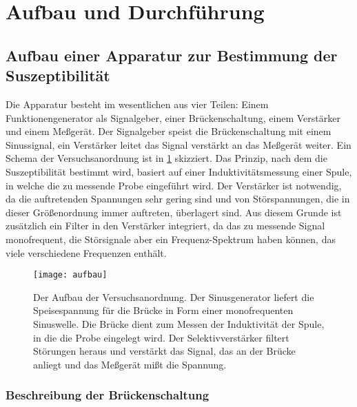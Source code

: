 
\section{Aufbau und Durchführung}

\subsection{Aufbau einer Apparatur zur Bestimmung der Suszeptibilität}
\label{sec:aufbau-apparatur}

Die Apparatur besteht im wesentlichen aus vier Teilen: Einem
Funktionengenerator als Signalgeber, einer Brückenschaltung, einem
Verstärker und einem Meßgerät.  Der Signalgeber speist die
Brückenschaltung mit einem Sinussignal, ein Verstärker leitet das Signal
verstärkt an das Meßgerät weiter.  Ein Schema der Versuchsanordnung ist
in \cref{fig:schema-aufbau} skizziert.  Das Prinzip, nach dem die
Suszeptibilität bestimmt wird, basiert auf einer Induktivitätsmessung
einer Spule, in welche die zu messende Probe eingeführt wird.  Der
Verstärker ist notwendig, da die auftretenden Spannungen sehr gering
sind und von Störspannungen, die in dieser Größenordnung immer
auftreten, überlagert sind.  Aus diesem Grunde ist zusätzlich ein Filter
in den Verstärker integriert, da das zu messende Signal monofrequent,
die Störsignale aber ein Frequenz-Spektrum haben können, das viele
verschiedene Frequenzen enthält.

\begin{figure}
  \centering
  \texttt{[image: aufbau]}
  \caption{Der Aufbau der Versuchsanordnung.  Der Sinusgenerator liefert
    die Speisespannung für die Brücke in Form einer monofrequenten
    Sinuswelle.  Die Brücke dient zum Messen der Induktivität der Spule,
    in die die Probe eingelegt wird.  Der Selektivverstärker filtert
    Störungen heraus und verstärkt das Signal, das an der Brücke anliegt
    und das Meßgerät mißt die Spannung.}
  \label{fig:schema-aufbau}
\end{figure}

\subsubsection{Beschreibung der Brückenschaltung}


